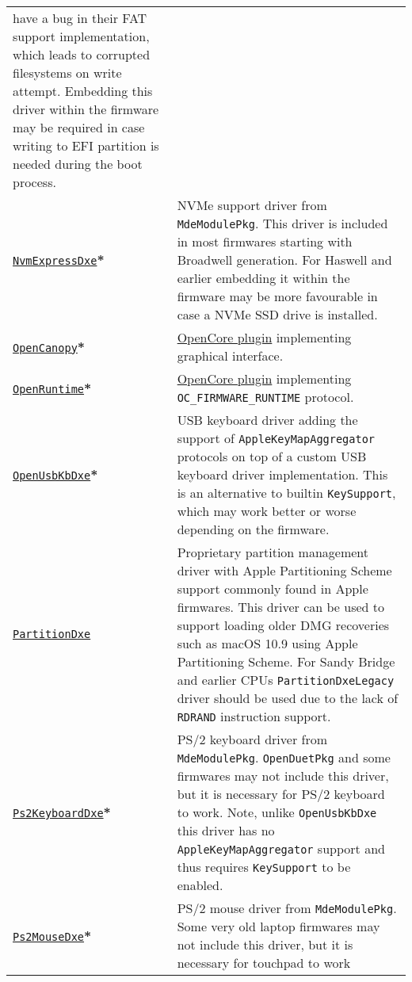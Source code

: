 \documentclass[]{article}
\begin{document}
\begin{tabular}{p{1.3in}p{5.55in}}
  have a bug in their FAT support implementation, which leads to corrupted filesystems
  on write attempt. Embedding this driver within the firmware may be required in case
  writing to EFI partition is needed during the boot process. \\
  \href{https://github.com/acidanthera/audk}{\texttt{NvmExpressDxe}}\textbf{*}
& NVMe support driver from \texttt{MdeModulePkg}. This driver is included in most
  firmwares starting with Broadwell generation. For Haswell and earlier embedding it
  within the firmware may be more favourable in case a NVMe SSD drive is installed. \\
\href{https://github.com/acidanthera/OpenCorePkg}{\texttt{OpenCanopy}}\textbf{*}
& \hyperref[ueficanopy]{OpenCore plugin} implementing graphical interface. \\
\href{https://github.com/acidanthera/OpenCorePkg}{\texttt{OpenRuntime}}\textbf{*}
& \hyperref[uefiruntime]{OpenCore plugin} implementing \texttt{OC\_FIRMWARE\_RUNTIME} protocol. \\
\href{https://github.com/acidanthera/OpenCorePkg}{\texttt{OpenUsbKbDxe}}\textbf{*}
& USB keyboard driver adding the support of \texttt{AppleKeyMapAggregator} protocols
  on top of a custom USB keyboard driver implementation. This is an alternative to
  builtin \texttt{KeySupport}, which may work better or worse depending on the firmware. \\
\href{https://github.com/acidanthera/OcBinaryData}{\texttt{PartitionDxe}}
& Proprietary partition management driver with Apple Partitioning Scheme support
  commonly found in Apple firmwares. This driver can be used to support loading
  older DMG recoveries such as macOS 10.9 using Apple Partitioning Scheme.
  For Sandy Bridge and earlier CPUs \texttt{PartitionDxeLegacy} driver should be
  used due to the lack of \texttt{RDRAND} instruction support. \\
  \href{https://github.com/acidanthera/audk}{\texttt{Ps2KeyboardDxe}}\textbf{*}
& PS/2 keyboard driver from \texttt{MdeModulePkg}. \texttt{OpenDuetPkg} and some firmwares
  may not include this driver, but it is necessary for PS/2 keyboard to work.
  Note, unlike \texttt{OpenUsbKbDxe} this driver has no \texttt{AppleKeyMapAggregator}
  support and thus requires \texttt{KeySupport} to be enabled. \\
  \href{https://github.com/acidanthera/audk}{\texttt{Ps2MouseDxe}}\textbf{*}
& PS/2 mouse driver from \texttt{MdeModulePkg}. Some very old laptop firmwares
  may not include this driver, but it is necessary for touchpad to work

\end{tabular}
\end{document}
